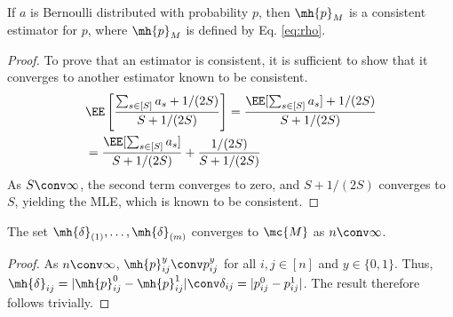 

\begin{thm}
If $a$ is Bernoulli distributed with probability $p$, then
$\mh{p}_M$ is a consistent estimator for $p$, where $\mh{p}_M$ is defined by Eq. \eqref{eq:rho}.
\end{thm}

\begin{proof}
To prove that an estimator is consistent, it is sufficient to show that it converges to another estimator known to be consistent.
\begin{align}
	&\EE\left[\frac{\sum_{s\in[S]} a_s+ 1/(2S)}{S + 1/(2S)}\right] = \frac{\EE[\sum_{s\in[S]} a_s] + 1/(2S)}{S + 1/(2S)} \nonumber\\&= \frac{\EE[\sum_{s\in[S]} a_s]}{S + 1/(2S)} + \frac{1/(2S)}{S + 1/(2S)} 
\end{align}
As $S\conv\infty$, the second term converges to zero, and $S+1/(2S)$ converges to $S$, yielding the MLE, which is known to be consistent.
\end{proof}




\begin{thm}\label{thm:}
	The set $\mh{\delta}_{(1)}, \ldots, \mh{\delta}_{(m)}$ converges to $\mc{M}$ as $n \conv \infty$.
\end{thm}

\begin{proof}\label{pf:}
	As $n\conv \infty$, $\mh{p}_{ij}^y \conv p_{ij}^y$ for all $i,j \in [n]$ and $y \in \{0,1\}$.  Thus, $\mh{\delta}_{ij}=|\mh{p}_{ij}^0-\mh{p}_{ij}^1| \conv \delta_{ij}=|p_{ij}^0-p_{ij}^1|$.  The result therefore follows trivially.
\end{proof}





